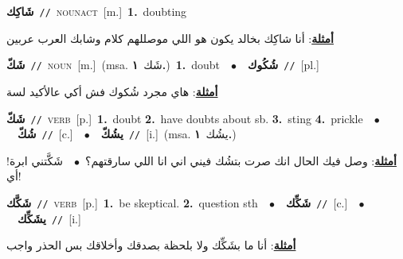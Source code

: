 \documentclass[10pt,a4paper,twoside]{article} %
\begin{document}
\begin{multicols}{2}
{\setlength\topsep{0pt}\textbf{\foreignlanguage{arabic}{شَاكِك}}\ {\color{gray}\texttt{//}\color{black}}\ \textsc{noun\textunderscore act}\ [m.]\ \textbf{1.}~doubting\  \begin{flushright}\color{gray}\foreignlanguage{arabic}{\textbf{\underline{\foreignlanguage{arabic}{أمثلة}}}: أنا شاكِك بخالد يكون هو اللي موصللهم كلام وشابك العرب عربين}\end{flushright}\color{black}} \vspace{2mm}

{\setlength\topsep{0pt}\textbf{\foreignlanguage{arabic}{شَكّ}}\ {\color{gray}\texttt{//}\color{black}}\ \textsc{noun}\ [m.]\ \color{gray}(msa. \foreignlanguage{arabic}{شَك}~\foreignlanguage{arabic}{\textbf{١.}})\color{black}\ \textbf{1.}~doubt\ \ $\bullet$\ \ \setlength\topsep{0pt}\textbf{\foreignlanguage{arabic}{شُكُوك}}\ {\color{gray}\texttt{//}\color{black}}\ [pl.]\  \begin{flushright}\color{gray}\foreignlanguage{arabic}{\textbf{\underline{\foreignlanguage{arabic}{أمثلة}}}: هاي مجرد شُكوك فش أكي عالأكيد لسة}\end{flushright}\color{black}} \vspace{2mm}

{\setlength\topsep{0pt}\textbf{\foreignlanguage{arabic}{شَكّ}}\ {\color{gray}\texttt{//}\color{black}}\ \textsc{verb}\ [p.]\ \textbf{1.}~doubt  \textbf{2.}~have doubts about sb.  \textbf{3.}~sting  \textbf{4.}~prickle\ \ $\bullet$\ \ \setlength\topsep{0pt}\textbf{\foreignlanguage{arabic}{شُكّ}}\ {\color{gray}\texttt{//}\color{black}}\ [c.]\ \ $\bullet$\ \ \setlength\topsep{0pt}\textbf{\foreignlanguage{arabic}{يشُكّ}}\ {\color{gray}\texttt{//}\color{black}}\ [i.]\ \color{gray}(msa. \foreignlanguage{arabic}{يشُك}~\foreignlanguage{arabic}{\textbf{١.}})\color{black}\  \begin{flushright}\color{gray}\foreignlanguage{arabic}{\textbf{\underline{\foreignlanguage{arabic}{أمثلة}}}: وصل فيك الحال انك صرت بتشُك فيني اني انا اللي سارقتهم؟\ $\bullet$\ \  شَكَّتني ابرة! أي!}\end{flushright}\color{black}} \vspace{2mm}

{\setlength\topsep{0pt}\textbf{\foreignlanguage{arabic}{شَكَّك}}\ {\color{gray}\texttt{//}\color{black}}\ \textsc{verb}\ [p.]\ \textbf{1.}~be skeptical.  \textbf{2.}~question sth\ \ $\bullet$\ \ \setlength\topsep{0pt}\textbf{\foreignlanguage{arabic}{شَكِّك}}\ {\color{gray}\texttt{//}\color{black}}\ [c.]\ \ $\bullet$\ \ \setlength\topsep{0pt}\textbf{\foreignlanguage{arabic}{يشَكِّك}}\ {\color{gray}\texttt{//}\color{black}}\ [i.]\  \begin{flushright}\color{gray}\foreignlanguage{arabic}{\textbf{\underline{\foreignlanguage{arabic}{أمثلة}}}: أنا ما بشَكِّك ولا بلحظة بصدقك وأخلاقك بس الحذر واجب}\end{flushright}\color{black}} \vspace{2mm}


\end{multicols}
\end{document}
